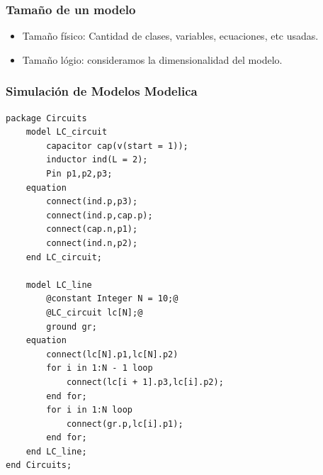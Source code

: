 \documentclass[aspectratio=169,10pt]{beamer}
\begin{document}
\begin{frame}[fragile]
\frametitle{Tama\~no de un modelo} 
\begin{itemize}
    \item Tama\~no f\'isico: Cantidad de clases, variables, ecuaciones, etc usadas.
    \item Tama\~no l\'ogio: consideramos la dimensionalidad del modelo.
\end{itemize}
 
\end{frame}



\begin{frame}[fragile]
\frametitle{Simulaci\'on de Modelos Modelica} 
\begin{lstlisting}[style=base]
package Circuits
    model LC_circuit
        capacitor cap(v(start = 1));
        inductor ind(L = 2);
        Pin p1,p2,p3;
    equation
        connect(ind.p,p3);
        connect(ind.p,cap.p);
        connect(cap.n,p1);
        connect(ind.n,p2);
    end LC_circuit;
    
    model LC_line
        @constant Integer N = 10;@
        @LC_circuit lc[N];@
        ground gr;
    equation
        connect(lc[N].p1,lc[N].p2)      
        for i in 1:N - 1 loop
            connect(lc[i + 1].p3,lc[i].p2);
        end for;
        for i in 1:N loop
            connect(gr.p,lc[i].p1);
        end for;
    end LC_line;
end Circuits;   
\end{lstlisting}
\end{frame}
\end{document}
